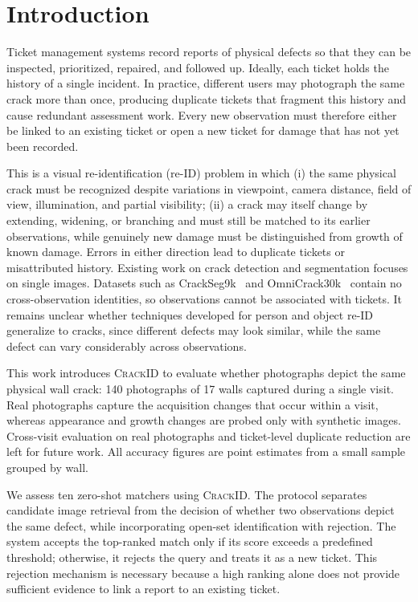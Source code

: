 \section{Introduction}

Ticket management systems record reports of physical defects so that they can be inspected, prioritized, repaired, and followed up.
Ideally, each ticket holds the history of a single incident.
In practice, different users may photograph the same crack more than once, producing duplicate tickets that fragment this history and cause redundant assessment work.
Every new observation must therefore either be linked to an existing ticket or open a new ticket for damage that has not yet been recorded.

This is a visual re-identification (re-ID) problem in which (i) the same physical crack must be recognized despite variations in viewpoint, camera distance, field of view, illumination, and partial visibility; (ii) a crack may itself change by extending, widening, or branching and must still be matched to its earlier observations, while genuinely new damage must be distinguished from growth of known damage.
Errors in either direction lead to duplicate tickets or misattributed history.
Existing work on crack detection and segmentation focuses on single images.
Datasets such as CrackSeg9k~\cite{kulkarni2022crackseg9k} and OmniCrack30k~\cite{benz2024omnicrack30k} contain no cross-observation identities, so observations cannot be associated with tickets.
It remains unclear whether techniques developed for person and object re-ID~\cite{zhou2019osnet,qian2024reidtrends} generalize to cracks, since different defects may look similar, while the same defect can vary considerably across observations.

This work introduces \textsc{CrackID} to evaluate whether photographs depict the same physical wall crack: 140 photographs of 17 walls captured during a single visit.
Real photographs capture the acquisition changes that occur within a visit, whereas appearance and growth changes are probed only with synthetic images.
Cross-visit evaluation on real photographs and ticket-level duplicate reduction are left for future work.
All accuracy figures are point estimates from a small sample grouped by wall.

We assess ten zero-shot matchers using \textsc{CrackID}.
The protocol separates candidate image retrieval from the decision of whether two observations depict the same defect, while incorporating open-set identification with rejection. The system accepts the top-ranked match only if its score exceeds a predefined threshold; otherwise, it rejects the query and treats it as a new ticket. This rejection mechanism is necessary because a high ranking alone does not provide sufficient evidence to link a report to an existing ticket.

